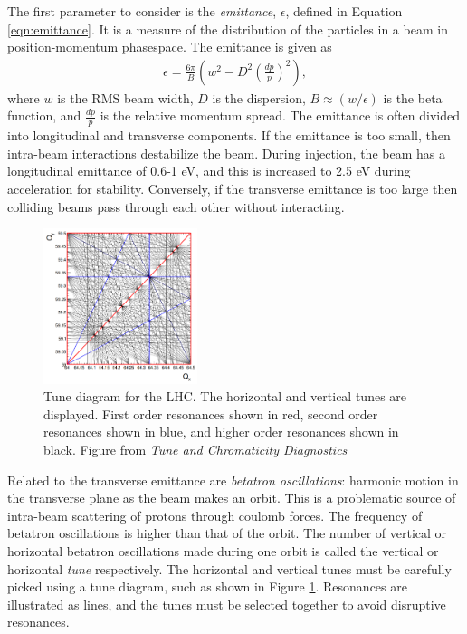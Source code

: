 The first parameter to consider is the \emph{emittance}, $\epsilon$, defined in Equation \ref{eqn:emittance}.
It is a measure of the distribution of the particles in a beam in position-momentum phasespace.
The emittance is given as
\begin{equation}\begin{split}\label{eqn:emittance}
\epsilon = \frac{6\pi}{B}(w^2-D^2(\frac{dp}{p})^2),
\end{split}\end{equation} 
where $w$ is the RMS beam width, $D$ is the dispersion, $B\approx(w/\epsilon)$ is the beta function, and $\frac{dp}{p}$ is the relative momentum spread.
The emittance is often divided into longitudinal and transverse components.
If the emittance is too small, then intra-beam interactions destabilize the beam. 
During injection, the beam has a longitudinal emittance of 0.6-1 eV, and this is increased to 2.5 eV during acceleration for stability.
Conversely, if the transverse emittance is too large then colliding beams pass through each other without interacting.
\cite{boussard}\cite{lyndon}\cite{pdgAccelSection}

\begin{figure}[h!]
\captionsetup[subfigure]{position=b}
\centering
\includegraphics[width=0.4\textwidth]{figures/experiment/tune.png}
\caption{Tune diagram for the LHC. The horizontal and vertical tunes are displayed. First order resonances shown in red, second order resonances shown in blue, and higher order resonances shown in black. Figure from \emph{Tune and Chromaticity Diagnostics} \cite{steinhagen}}
\label{fig:tune}
\end{figure}

Related to the transverse emittance are \emph{betatron oscillations}: harmonic motion in the transverse plane as the beam makes an orbit.\cite{pdgAccelSection}
This is a problematic source of intra-beam scattering of protons through coulomb forces.
The frequency of betatron oscillations is higher than that of the orbit.
The number of vertical or horizontal betatron oscillations made during one orbit is called the vertical or horizontal \emph{tune} respectively.
The horizontal and vertical tunes must be carefully picked using a tune diagram, such as shown in Figure \ref{fig:tune}.
Resonances are illustrated as lines, and the tunes must be selected together to avoid disruptive resonances.

